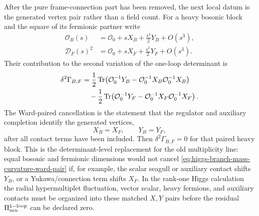 \begin{example}
\label{ex:higgs-branch-mass-curvature-ward-pair}
After the pure frame-connection part has been removed, the next local datum is
the generated vertex pair rather than a field count.  For a heavy bosonic block
and the square of its fermionic partner write
\[
\begin{aligned}
  {\mathcal O}_B(s)
  &=
  {\mathcal O}_0+sX_B+\frac{s^2}{2}Y_B+O(s^3),\\
  {\mathcal D}_F(s)^2
  &=
  {\mathcal O}_0+sX_F+\frac{s^2}{2}Y_F+O(s^3).
\end{aligned}
\]
Their contribution to the second variation of the one-loop determinant is
\begin{equation}
\begin{aligned}
  \delta^2\Gamma_{B,F}
  &=
  \frac12\,{\rm Tr}\!
  \left(
    {\mathcal O}_0^{-1}Y_B
    -
    {\mathcal O}_0^{-1}X_B{\mathcal O}_0^{-1}X_B
  \right)\\
  &\quad
  -
  \frac12\,{\rm Tr}\!
  \left(
    {\mathcal O}_0^{-1}Y_F
    -
    {\mathcal O}_0^{-1}X_F{\mathcal O}_0^{-1}X_F
  \right).
  \label{eq:higgs-branch-mass-curvature-ward-pair}
\end{aligned}
\end{equation}
The Ward-paired cancellation is the statement that the regulator and auxiliary
completion identify the generated vertices,
\[
  X_B=X_F,\qquad Y_B=Y_F ,
\]
after all contact terms have been included.  Then
\(\delta^2\Gamma_{B,F}=0\) for that paired heavy block.  This is the determinant-level
replacement for the old multiplicity line: equal bosonic and fermionic
dimensions would not cancel
\eqref{eq:higgs-branch-mass-curvature-ward-pair} if, for example, the scalar
seagull or auxiliary contact shifts \(Y_B\), or a Yukawa/connection term shifts
\(X_F\).  In the rank-one Higgs calculation the radial hypermultiplet
fluctuation, vector scalar, heavy fermions, and auxiliary contacts must be
organized into these matched \(X,Y\) pairs before the residual
\(\Pi_{mn}^{\rm 1-loop}\) can be declared zero.
\end{example}


